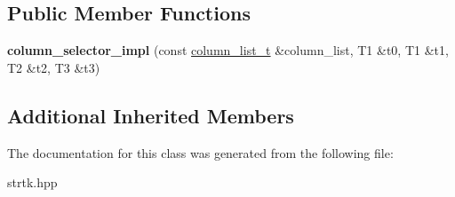 \subsection*{Public Member Functions}
\begin{DoxyCompactItemize}
\item 
\hypertarget{classstrtk_1_1details_1_1column__selector__impl_3_01T0_00_01T1_00_01T2_00_01T3_01_4_ac0c717f4ff5118dc4fa3a8a89f10fd3f}{{\bfseries column\-\_\-selector\-\_\-impl} (const \hyperlink{structstrtk_1_1details_1_1column__list__impl}{column\-\_\-list\-\_\-t} \&column\-\_\-list, T1 \&t0, T1 \&t1, T2 \&t2, T3 \&t3)}\label{classstrtk_1_1details_1_1column__selector__impl_3_01T0_00_01T1_00_01T2_00_01T3_01_4_ac0c717f4ff5118dc4fa3a8a89f10fd3f}

\end{DoxyCompactItemize}
\subsection*{Additional Inherited Members}


The documentation for this class was generated from the following file\-:\begin{DoxyCompactItemize}
\item 
strtk.\-hpp\end{DoxyCompactItemize}

